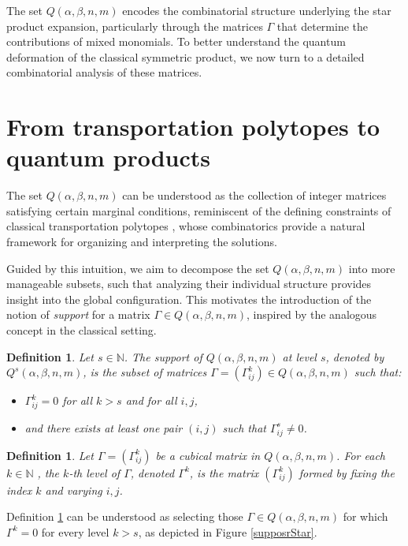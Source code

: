 \documentclass[11pt]{article}
\newtheorem{defi}[thm]{Definition}
\begin{document}
The set \( Q(\alpha, \beta, n, m) \) encodes the combinatorial structure underlying the star product expansion, particularly through the matrices \( \Gamma \) that determine the contributions of mixed monomials. To better understand the quantum deformation of the classical symmetric product, we now turn to a detailed combinatorial analysis of these matrices.


\section{From transportation polytopes to quantum products}
The set $ Q(\alpha, \beta, n, m)$ can be understood as the collection of integer matrices satisfying certain marginal conditions, reminiscent of the defining constraints of classical transportation polytopes \cite{Loera}, whose combinatorics provide a natural framework for organizing and interpreting the solutions.

Guided by this intuition, we aim to decompose the set $ Q(\alpha, \beta, n, m)$ into more manageable subsets, such that analyzing their individual structure provides insight into the global configuration. This motivates the introduction of the notion of \emph{support} for a matrix $ \Gamma \in Q(\alpha, \beta, n, m) $, inspired by the analogous concept in the classical setting.

\begin{defi}\label{defiSoporte}
Let \( s \in \mathbb{N}\). The \emph{support} of \( Q(\alpha, \beta, n, m) \) at level \( s \), denoted by \( Q^{s}(\alpha, \beta, n, m) \), is the subset of matrices \( \Gamma = (\Gamma_{ij}^k) \in Q(\alpha, \beta, n, m) \) such that:
\begin{itemize}
    \item \( \Gamma_{ij}^k = 0 \) for all \( k > s \) and for all \( i, j \),
    \item and there exists at least one pair \( (i,j) \) such that \( \Gamma_{ij}^s \neq 0 \).
\end{itemize}
\end{defi}


\begin{defi}
Let $\Gamma = (\Gamma_{ij}^k)$ be a cubical matrix in $Q(\alpha, \beta, n, m)$. For each $ k \in  \mathbb{N}$ , the \emph{$k$-th level} of $\Gamma$, denoted $ \Gamma^k $, is the matrix $ (\Gamma_{ij}^k)$ formed by fixing the index $k$  and varying $i, j$.
\end{defi}

Definition \ref{defiSoporte} can be understood as selecting those $\Gamma \in Q(\alpha,\beta,n,m)$ for which $\Gamma^k = 0$ for every level $k > s$, as depicted in Figure \ref{supposrStar}.
\end{document}
